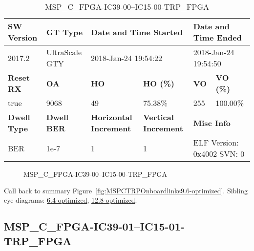 \begin{table}[h]
\centering
\caption{MSP\_C\_FPGA-IC39-00--IC15-00-TRP\_FPGA}
\label{tab:MSPCFPGAIC3900IC1500TRPFPGA9.6-optimized}
\begin{tabular}{@{}|l|l|l|l|l|l|@{}}
\toprule
\textbf{SW Version}                & \textbf{GT Type}   & \multicolumn{2}{l|}{\textbf{Date and Time Started}}            & \multicolumn{2}{l|}{\textbf{Date and Time Ended}}        \\ \midrule
2017.2                       & UltraScale GTY          & \multicolumn{2}{l|}{2018-Jan-24 19:54:22}                   & \multicolumn{2}{l|}{2018-Jan-24 19:54:50}               \\ \midrule
\textbf{Reset RX}                  & \textbf{OA} & \textbf{HO}   & \textbf{HO (\%)} & \textbf{VO} & \textbf{VO (\%)} \\ \midrule
true & 9068        & 49          & 75.38\%        & 255        & 100.00\%       \\ \midrule
\textbf{Dwell Type}                & \textbf{Dwell BER} & \textbf{Horizontal Increment} & \textbf{Vertical Increment}    & \multicolumn{2}{l|}{\textbf{Misc Info}}                  \\ \midrule
BER                            & 1e-7        & 1        & 1           & \multicolumn{2}{l|}{ELF Version: 0x4002 SVN: 0}                         \\ \bottomrule
\end{tabular}
\end{table}

\begin{figure}[h]
\caption{MSP\_C\_FPGA-IC39-00--IC15-00-TRP\_FPGA} \label{fig:MSPCFPGAIC3900IC1500TRPFPGA9.6-optimized}
\end{figure}

Call back to summary Figure~\ref{fig:MSPCTRPOnboardlinks9.6-optimized}.
Sibling eye diagrams: \hyperref[sec:MSPCFPGAIC3900IC1500TRPFPGA6.4-optimized]{6.4-optimized}, \hyperref[sec:MSPCFPGAIC3900IC1500TRPFPGA12.8-optimized]{12.8-optimized}.

\clearpage
\newpage


\subsection{MSP\_C\_FPGA-IC39-01--IC15-01-TRP\_FPGA}\label{sec:MSPCFPGAIC3901IC1501TRPFPGA9.6-optimized}

